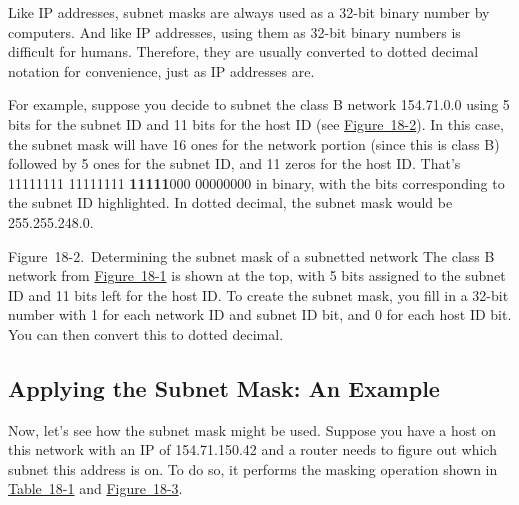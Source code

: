 Like IP addresses, subnet
\protect\hypertarget{ch18s03.htmlux5cux23idx-CHP-18-0724}{}{}masks are
always used as a 32-bit binary number by computers. And like IP
addresses, using them as 32-bit binary numbers is difficult for humans.
Therefore, they are usually converted to dotted decimal notation for
convenience, just as IP addresses are.

For example, suppose you
\protect\hypertarget{ch18s03.htmlux5cux23idx-CHP-18-0725}{}{}decide to
subnet the class B network 154.71.0.0 using 5 bits for the subnet ID and
11 bits for the host ID (see
\protect\hyperlink{ch18s03.htmlux5cux23determining_the_subnet_mask_of_a_subnett}{Figure~18-2}).
In this case, the subnet mask will have 16 ones for the network portion
(since this is class B) followed by 5 ones for the subnet ID, and 11
zeros for the host ID. That's 11111111 11111111 {\textbf{11111}}000
00000000 in binary, with the bits corresponding to the subnet ID
highlighted. In dotted decimal, the subnet mask would be 255.255.248.0.

\protect\hypertarget{ch18s03.htmlux5cux23determining_the_subnet_mask_of_a_subnett}{}{}

\protect\hypertarget{ch18s03.htmlux5cux23I_mediaobject4_d1e18274}{}{}

Figure~18-2.~Determining the subnet mask of a subnetted network The
class B network from
\protect\hyperlink{ch18s02.htmlux5cux23subnetting_class_b_network_we_begin_with}{Figure~18-1}
is shown at the top, with 5 bits assigned to the subnet ID and 11 bits
left for the host ID. To create the subnet mask, you fill in a 32-bit
number with 1 for each network ID and subnet ID bit, and 0 for each host
ID bit. You can then convert this to dotted decimal.

\subsection{Applying the Subnet Mask: An Example}

Now, let's see how the subnet mask might be used. Suppose you have a
host on this network with an IP of 154.71.150.42 and a router needs to
figure out which subnet this address is on. To do so, it performs the
masking operation shown in
\protect\hyperlink{ch18s03.htmlux5cux23determining_the_subnet_id_of_an_ip_addre}{Table~18-1}
and
\protect\hyperlink{ch18s03.htmlux5cux23determining_the_subnet_id_of_an_ip-id001}{Figure~18-3}.

\protect\hypertarget{ch18s03.htmlux5cux23determining_the_subnet_id_of_an_ip_addre}{}{}

